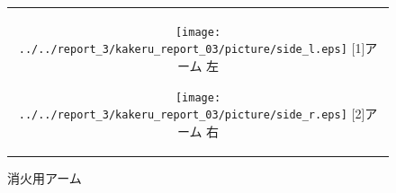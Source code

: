 				       
				       
\begin{figure}[h]		       
 \centering			       
 \begin{tabular}{c}		       
				       
  \begin{minipage}{0.3\hsize}	       
   \centering			       
   \texttt{[image: ../../report\_3/kakeru\_report\_03/picture/side\_l.eps]}
   \hspace{1.6cm} [1]アーム 左	       
  \end{minipage}		       
				       
  \begin{minipage}{0.45\hsize}	       
   \centering			       
   \texttt{[image: ../../report\_3/kakeru\_report\_03/picture/side\_r.eps]}
   \hspace{1.6cm} [2]アーム 右
  \end{minipage}
 \end{tabular}
 \caption{消火用アーム}
 \label{arm_real}
\end{figure}
